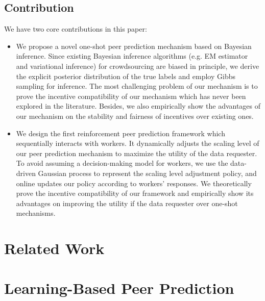 \documentclass{article}
\begin{document}
\subsection{Contribution}
We have two core contributions in this paper:
\begin{itemize}
\item We propose a novel one-shot peer prediction mechanism based on Bayesian inference. Since existing Bayesian inference algorithms (e.g. EM estimator and variational inference) for crowdsourcing are biased in principle, we derive the explicit posterior distribution of the true labels and employ Gibbs sampling for inference. The most challenging problem of our mechanism is to prove the incentive compatibility of our mechanism which has never been explored in the literature. Besides, we also empirically show the advantages of our mechanism on the stability and fairness of incentives over existing ones.
\item We design the first reinforcement peer prediction framework which sequentially interacts with workers. It dynamically adjusts the scaling level of our peer prediction mechanism to maximize the utility of the data requester. To avoid assuming a decision-making model for workers, we use the data-driven Gaussian process to represent the scaling level adjustment policy, and online updates our policy according to workers' responses. We theoretically prove the incentive compatibility of our framework and empirically show its advantages on improving the utility if the data requester over one-shot mechanisms.
\end{itemize}

\section{Related Work}

\section{Learning-Based Peer Prediction}
\end{document}
